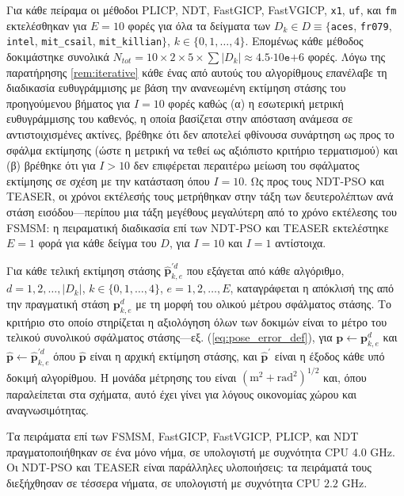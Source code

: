 Για κάθε πείραμα οι μέθοδοι PLICP, NDT, FastGICP, FastVGICP, \texttt{x1},
\texttt{uf}, και \texttt{fm} εκτελέσθηκαν για $E = 10$ φορές για όλα τα
δείγματα των $D_k \in D \equiv \{$\texttt{aces}, \texttt{fr079},
\texttt{intel}, \texttt{mit\_csail}, \texttt{mit\_killian}$\}$, $k \in
\{0,1,\dots,4\}$.  Επομένως κάθε μέθοδος δοκιμάστηκε συνολικά $N_{tot} = 10
\times 2 \times 5 \times \sum |D_k|\approx 4.5$$\cdot10$$\texttt{e}$$+$$6$
φορές. Λόγω της παρατήρησης \ref{rem:iterative} κάθε ένας από αυτούς του
αλγορίθμους επανέλαβε τη διαδικασία ευθυγράμμισης με βάση την ανανεωμένη
εκτίμηση στάσης του προηγούμενου βήματος για $I = 10$ φορές καθώς (α) η
εσωτερική μετρική ευθυγράμμισης του καθενός, η οποία βασίζεται στην απόσταση
ανάμεσα σε αντιστοιχισμένες ακτίνες, βρέθηκε ότι δεν αποτελεί φθίνουσα
συνάρτηση ως προς το σφάλμα εκτίμησης (ώστε η μετρική να τεθεί ως αξιόπιστο
κριτήριο τερματισμού) και (β) βρέθηκε ότι για $I > 10$ δεν επιφέρεται περαιτέρω
μείωση του σφάλματος εκτίμησης σε σχέση με την κατάσταση όπου $I=10$.  Ως προς
τους NDT-PSO και TEASER, οι χρόνοι εκτέλεσής τους μετρήθηκαν στην τάξη των
δευτερολέπτων ανά στάση εισόδου---περίπου μια τάξη μεγέθους μεγαλύτερη από το
χρόνο εκτέλεσης του FSMSM: η πειραματική διαδικασία επί των NDT-PSO και TEASER
εκτελέστηκε $E=1$ φορά για κάθε δείγμα του $D$, για $I=10$ και $I=1$ αντίστοιχα.

Για κάθε τελική εκτίμηση στάσης $\hat{\bm{p}}_{k,e}^{\prime d}$ που εξάγεται από
κάθε αλγόριθμο, $d = 1,2,\dots,|D_k|$, $k \in \{0,1,\dots,4\}$,
$e=1,2,\dots,E$, καταγράφεται η απόκλισή της από την πραγματική στάση
$\bm{p}_{k,e}^d$ με τη μορφή του ολικού μέτρου σφάλματος στάσης. Το κριτήριο
στο οποίο στηρίζεται η αξιολόγηση όλων των δοκιμών είναι το μέτρο του τελικού
συνολικού σφάλματος στάσης---εξ. (\ref{eq:pose_error_def}), για $\bm{p}
\leftarrow \bm{p}^d_{k,e}$ και $\hat{\bm{p}} \leftarrow
\hat{\bm{p}}^{\prime d}_{k,e}$ όπου $\hat{\bm{p}}$ είναι η αρχική εκτίμηση
στάσης, και $\hat{\bm{p}}^\prime$ είναι η έξοδος κάθε υπό δοκιμή αλγορίθμου. Η
μονάδα μέτρησης του είναι $(\text{m}^2+\text{rad}^2)^{1/2}$ και, όπου
παραλείπεται στα σχήματα, αυτό έχει γίνει για λόγους οικονομίας χώρου και
αναγνωσιμότητας.

Τα πειράματα επί των FSMSM, FastGICP, FastVGICP, PLICP, και NDT
πραγματοποιήθηκαν σε ένα μόνο νήμα, σε υπολογιστή με συχνότητα CPU $4.0$ GHz.
Οι NDT-PSO και TEASER είναι παράλληλες υλοποιήσεις: τα πειράματά τους
διεξήχθησαν σε τέσσερα νήματα, σε υπολογιστή με συχνότητα CPU $2.2$ GHz.



